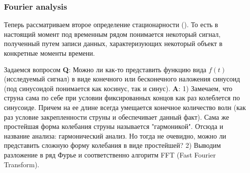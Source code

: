 \subsubsection{Fourier analysis} \label{link::fourier_analysis}
\noindent Теперь рассматриваем второе определение стационарности (). То есть в настоящий момент под временным рядом понимается некоторый сигнал, полученный путем записи данных, характеризующих некоторый объект в конкретные моменты времени.

Задаемся вопросом \textbf{Q}: Можно ли как-то представить функцию вида $f(t)$ (исследуемый сигнал) в виде конечного или бесконечного наложения синусоид (под синусоидой понимается как косинус, так и синус). \textbf{A}: 1) Замечаем, что струна сама по себе при условии фиксированных концов как раз колеблется по синусоиде. Причем на ее длине всегда умещается конечное количество волн (как раз условие закрепленности струны и обеспечивает данный факт). Сама же простейшая форма колебания струны называется "гармоникой". Отсюда и название анализа: гармонический анализ. Но тогда не очевидно, можно ли представить сложную форму колебания в виде простейшей? 2) Выводим разложение в ряд Фурье и соответственно алгоритм FFT (Fast Fourier Transform).

